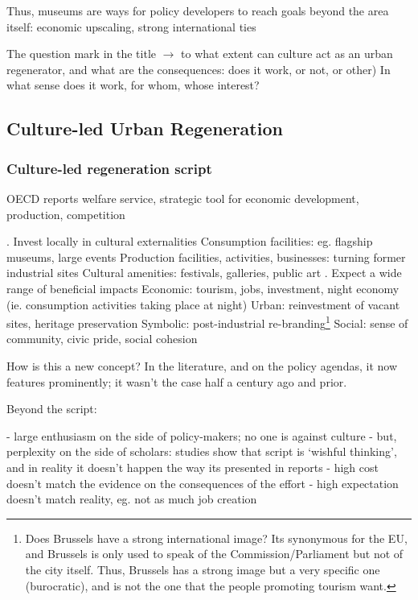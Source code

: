 \documentclass{article}
\begin{document}
Thus, museums are ways for policy developers to reach goals beyond the area itself: economic upscaling, strong international ties

The question mark in the title $\rightarrow$ to what extent can culture act as an urban regenerator, and what are the consequences: does it work, or not, or other)
In what sense does it work, for whom, whose interest?

\subsection{Culture-led Urban Regeneration}

\subsubsection{Culture-led regeneration script}

OECD reports 
welfare service, strategic tool for economic development, production, competition

\begin{outline}
	. Invest locally in cultural externalities
		\2 Consumption facilities: eg. flagship museums, large events
		\2 Production facilities, activities, businesses: turning former industrial sites
		\2 Cultural amenities: festivals, galleries, public art
	. Expect a wide range of beneficial impacts
		\2 Economic: tourism, jobs, investment, night economy (ie. consumption activities taking place at night)
		\2 Urban: reinvestment of vacant sites, heritage preservation
		\2 Symbolic: post-industrial re-branding\footnote{Does Brussels have a strong international image? Its synonymous for the EU, and Brussels is only used to speak of the Commission/Parliament but not of the city itself. Thus, Brussels has a strong image but a very specific one (burocratic), and is not the one that the people promoting tourism want.}
		\2 Social: sense of community, civic pride, social cohesion
\end{outline}

How is this a new concept? In the literature, and on the policy agendas, it now features prominently; it wasn't the case half a century ago and prior. 

Beyond the script:

- large enthusiasm on the side of policy-makers; no one is against culture
- but, perplexity on the side of scholars: studies show that script is `wishful thinking', and in reality it doesn't happen the way its presented in reports
	- high cost doesn't match the evidence on the consequences of the effort
	- high expectation doesn't match reality, eg. not as much job creation
\end{document}
